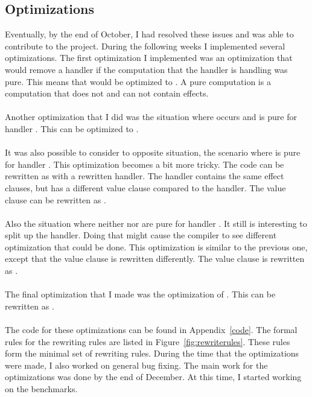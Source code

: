 \subsection{Optimizations}
Eventually, by the end of October, I had resolved these issues and was able to contribute to the project. During the following weeks I implemented several optimizations. The first optimization I implemented was an optimization that would remove a handler if the computation that the handler is handling was pure. This means that  would be optimized to . A pure computation is a computation that does not and can not contain effects. \\
\\
Another optimization that I did was the situation where  occurs and  is pure for handler . This can be optimized to . \\
\\
It was also possible to consider to opposite situation, the scenario where  is pure for handler . This optimization becomes a bit more tricky. The code  can be rewritten as  with  a rewritten handler. The  handler contains the same effect clauses, but has a different value clause compared to the  handler. The value clause can be rewritten as . \\
\\
Also the situation where neither  nor  are pure for handler . It still is interesting to split up the handler. Doing that might cause the compiler to see different optimization that could be done. This optimization is similar to the previous one, except that the value clause is rewritten differently. The value clause is rewritten as . \\
\\
The final optimization that I made was the optimization of . This can be rewritten as . \\
\\
The code for these optimizations can be found in Appendix~\ref{code}. The formal rules for the rewriting rules are listed in Figure~\ref{fig:rewriterules}. These rules form the minimal set of rewriting rules. During the time that the optimizations were made, I also worked on general bug fixing. The main work for the optimizations was done by the end of December. At this time, I started working on the benchmarks.
